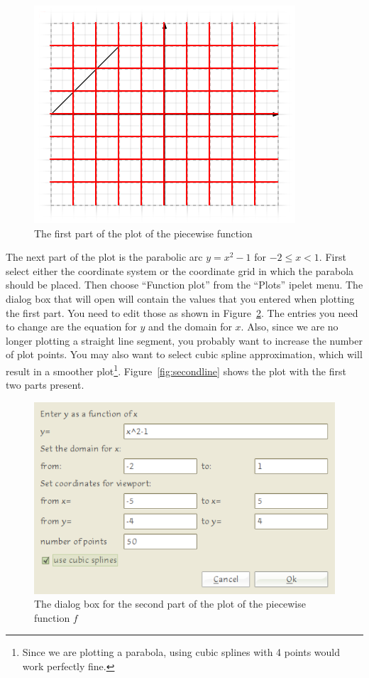 \documentclass{article}
\begin{document}
\begin{figure}[h]
   \begin{center}
      \includegraphics[scale=2]{firstline.png}
   \end{center}
   \caption{The first part of the plot of the piecewise function}
   \label{fig:firstline}
\end{figure}

The next part of the plot is the parabolic arc $y = x^2 - 1$ for $-2 \le x <
1$.  First select either the coordinate system or the coordinate grid in which
the parabola should be placed.  Then choose ``Function plot'' from the
``Plots'' ipelet menu.  The dialog box that will open will contain the values
that you entered when plotting the first part.  You need to edit those as shown
in Figure~\ref{fig:secondline_dialog}.  The entries you need to change are the
equation for $y$ and the domain for $x$.  Also, since we are no longer plotting
a straight line segment, you probably want to increase the number of plot points.
You may also want to select cubic spline approximation, which will result in a
smoother plot\footnote{Since we are plotting a parabola, using cubic splines
with 4 points would work perfectly fine.}.  Figure~\ref{fig:secondline} shows
the plot with the first two parts present. 

\begin{figure}[h]
   \begin{center}
      \includegraphics[scale=3]{secondline_dialog.png}
   \end{center}
   \caption{The dialog box for the second part of the plot of the piecewise
   function $f$}
   \label{fig:secondline_dialog}
\end{figure}
\end{document}
